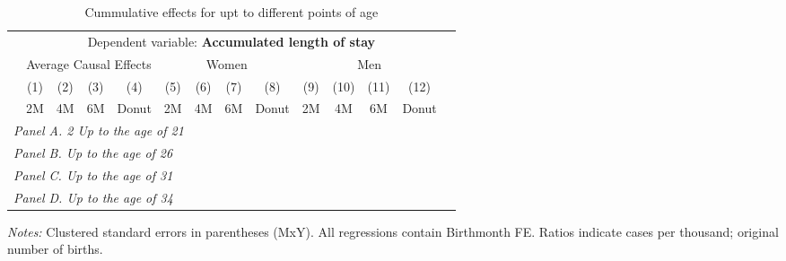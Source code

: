  \begin{table}[H] \begin{threeparttable} \centering \caption{Cummulative effects for upt to different points of age} {\def\sym#1{\ifmmode^{#1}\else\(^{#1}\)\fi} \begin{tabular}{l*{13}{c}} \toprule & \multicolumn{12}{c}{Dependent variable: \textbf{Accumulated length of stay}} \\ \cmidrule(lr){2-13}
            &\multicolumn{4}{c}{Average Causal Effects}         &\multicolumn{4}{c}{Women}                          &\multicolumn{4}{c}{Men}                            \\\cmidrule(lr){2-5}\cmidrule(lr){6-9}\cmidrule(lr){10-13}
            &\multicolumn{1}{c}{(1)}&\multicolumn{1}{c}{(2)}&\multicolumn{1}{c}{(3)}&\multicolumn{1}{c}{(4)}&\multicolumn{1}{c}{(5)}&\multicolumn{1}{c}{(6)}&\multicolumn{1}{c}{(7)}&\multicolumn{1}{c}{(8)}&\multicolumn{1}{c}{(9)}&\multicolumn{1}{c}{(10)}&\multicolumn{1}{c}{(11)}&\multicolumn{1}{c}{(12)}\\
            &\multicolumn{1}{c}{2M}&\multicolumn{1}{c}{4M}&\multicolumn{1}{c}{6M}&\multicolumn{1}{c}{Donut}&\multicolumn{1}{c}{2M}&\multicolumn{1}{c}{4M}&\multicolumn{1}{c}{6M}&\multicolumn{1}{c}{Donut}&\multicolumn{1}{c}{2M}&\multicolumn{1}{c}{4M}&\multicolumn{1}{c}{6M}&\multicolumn{1}{c}{Donut}\\
\midrule
 \multicolumn{13}{l}{\emph{Panel A. 2 Up to the age of 21}} \\   \midrule\multicolumn{13}{l}{\emph{Panel B. Up to the age of 26}} \\   \midrule\multicolumn{13}{l}{\emph{Panel C. Up to the age of 31}} \\   \midrule\multicolumn{13}{l}{\emph{Panel D. Up to the age of 34}} \\   
\bottomrule \end{tabular} } \begin{tablenotes} \item \scriptsize \emph{Notes:} Clustered standard errors in parentheses (MxY). All regressions contain Birthmonth FE. Ratios indicate cases per thousand; original number of births. \end{tablenotes} \end{threeparttable} \end{table} 
